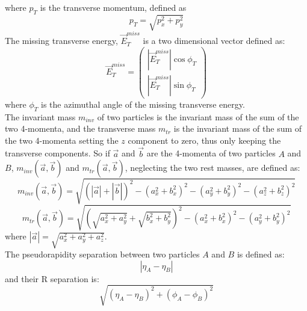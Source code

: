 \documentclass[12pt]{article}
\begin{document}
where $p_T$ is the transverse momentum, defined as
\begin{equation}
  p_T = \sqrt{p_x^2 + p_y^2}
\end{equation}
The missing transverse energy, $\vec{E}^{miss}_{T}$ is a two dimensional vector defined as:
\begin{equation}
  \vec{E}^{miss}_{T} = \begin{pmatrix}
	|\vec{E}^{miss}_{T}| \cos\phi_T \\
	|\vec{E}^{miss}_{T}| \sin\phi_T
  \end{pmatrix}
\end{equation}
where $\phi_T$ is the azimuthal angle of the missing transverse energy. \\
The invariant mass $m_{inv}$ of two particles is the invariant mass of the sum of the two 4-momenta, and 
the transverse mass $m_{tr}$ is the invariant mass of the sum of the two 4-momenta setting the $z$ component 
to zero, thus only keeping the transverse components.
So if $\vec{a}$ and $\vec{b}$ are the 4-momenta of two particles $A$ and $B$, $m_{inv}(\vec{a},\vec{b})$ 
and $m_{tr}(\vec{a},\vec{b})$, neglecting the two rest masses, are defined as:
\begin{equation}
  m_{inv}(\vec{a},\vec{b}) = \sqrt{\left(|\vec{a}| + |\vec{b}| \right)^2 
  - (a_x^2 + b_x^2)^2 - (a_y^2 + b_y^2)^2 - (a_z^2 + b_z^2)^2}
\end{equation}
\begin{equation}
  m_{tr}(\vec{a},\vec{b}) = \sqrt{\left(\sqrt{a_x^2 + a_y^2} + \sqrt{b_x^2 + b_y^2}\right)^2 
  - (a_x^2 + b_x^2)^2 - (a_y^2 + b_y^2)^2}
\end{equation}
where $|\vec{a}| = \sqrt{a_x^2 + a_y^2 + a_z^2}$. \\
The pseudorapidity separation between two particles $A$ and $B$ is defined as:
\begin{equation}
  |\eta_A - \eta_B|
\end{equation}
and their R separation is:
\begin{equation}
  \sqrt{(\eta_A - \eta_B)^2 + (\phi_A - \phi_B)^2}
\end{equation}
\end{document}
